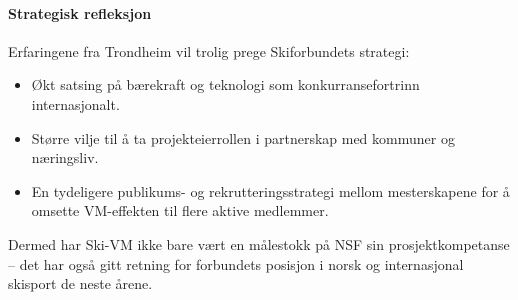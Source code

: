 \paragraph{Strategisk refleksjon}
Erfaringene fra Trondheim vil trolig prege Skiforbundets strategi:
\begin{itemize}
    \item Økt satsing på bærekraft og teknologi som konkurransefortrinn internasjonalt.
    \item Større vilje til å ta projekteierrollen i partnerskap med kommuner og næringsliv.
    \item En tydeligere publikums- og rekrutteringsstrategi mellom mesterskapene for å omsette VM-effekten til flere aktive medlemmer.
\end{itemize}

Dermed har Ski-VM ikke bare vært en målestokk på NSF sin prosjektkompetanse -- det har også gitt retning for forbundets posisjon i norsk og internasjonal skisport de neste årene.